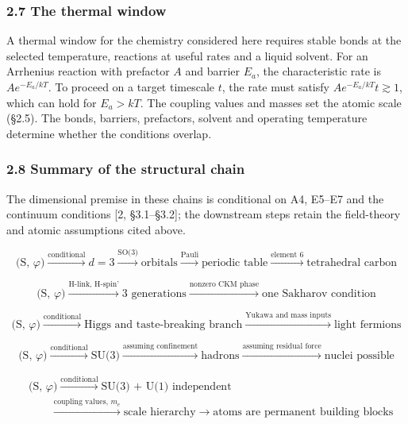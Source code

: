 \documentclass[
]{article}
\begin{document}
\hypertarget{the-thermal-window}{%
\subsubsection{2.7 The thermal window}\label{the-thermal-window}}

A thermal window for the chemistry considered here requires stable bonds
at the selected temperature, reactions at useful rates and a liquid
solvent. For an Arrhenius reaction with prefactor \(A\) and barrier
\(E_a\), the characteristic rate is \(A e^{-E_a/kT}\). To proceed on a
target timescale \(t\), the rate must satisfy
\(A e^{-E_a/kT}t\gtrsim 1\), which can hold for \(E_a>kT\). The coupling
values and masses set the atomic scale (§2.5). The bonds, barriers,
prefactors, solvent and operating temperature determine whether the
conditions overlap.

\hypertarget{summary-of-the-structural-chain}{%
\subsubsection{2.8 Summary of the structural
chain}\label{summary-of-the-structural-chain}}

The dimensional premise in these chains is conditional on A4, E5--E7 and
the continuum conditions {[}2, §3.1--§3.2{]}; the downstream steps
retain the field-theory and atomic assumptions cited above.

\[\text{(S, } \varphi\text{)} \xrightarrow{\text{conditional}} d = 3 \xrightarrow{\text{SO(3)}} \text{orbitals} \xrightarrow{\text{Pauli}} \text{periodic table} \xrightarrow{\text{element 6}} \text{tetrahedral carbon}\]

\[\text{(S, } \varphi\text{)} \xrightarrow{\text{H-link, H-spin'}} \text{3 generations} \xrightarrow{\text{nonzero CKM phase}} \text{one Sakharov condition}\]

\[\text{(S, } \varphi\text{)} \xrightarrow{\text{conditional}} \text{Higgs and taste-breaking branch} \xrightarrow{\text{Yukawa and mass inputs}} \text{light fermions}\]

\[\text{(S, } \varphi\text{)} \xrightarrow{\text{conditional}} \text{SU(3)} \xrightarrow{\text{assuming confinement}} \text{hadrons} \xrightarrow{\text{assuming residual force}} \text{nuclei possible}\]

\[\begin{aligned}
&\text{(S, } \varphi\text{)} \xrightarrow{\text{conditional}} \text{SU(3) + U(1) independent}\\
&\qquad \xrightarrow{\text{coupling values, } m_e} \text{scale hierarchy} \xrightarrow{} \text{atoms are permanent building blocks}
\end{aligned}\]
\end{document}
